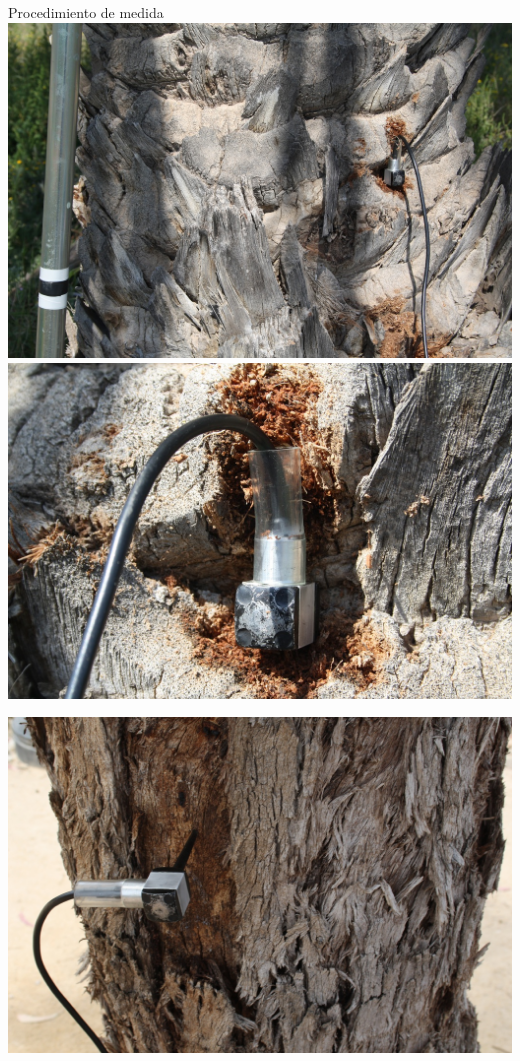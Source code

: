 \documentclass[utf8, compress]			{beamer}
\begin{document}
\begin{frame}{Procedimiento de medida}
    \includegraphics{mpalmeratodo.jpg}
    \hspace{1.5em}
    \includegraphics{mpalmeradetalle.jpg}
    \medskip\par
    \includegraphics{meucalipto.jpg}

\end{frame}
\end{document}
